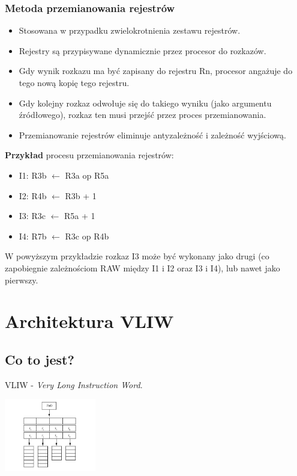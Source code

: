 		\subsubsection{Metoda przemianowania rejestrów}
			\begin{itemize}
				\item Stosowana w przypadku zwielokrotnienia zestawu rejestrów.
				\item Rejestry są przypisywane dynamicznie przez procesor do rozkazów.
				\item Gdy wynik rozkazu ma być zapisany do rejestru Rn, procesor angażuje do tego nową kopię tego rejestru.
				\item Gdy kolejny rozkaz odwołuje się do takiego wyniku (jako argumentu źródłowego), rozkaz ten musi przejść przez proces przemianowania.
				\item Przemianowanie rejestrów eliminuje antyzależność i zależność wyjściową.
			\end{itemize}
			\textbf{Przykład} procesu przemianowania rejestrów:
			\begin{itemize}
				\item I1: R3b $ \leftarrow $ R3a op R5a
				\item I2: R4b $ \leftarrow $ R3b + 1
				\item I3: R3c $ \leftarrow $ R5a + 1
				\item I4: R7b $ \leftarrow $ R3c op R4b
			\end{itemize}
			W powyższym przykładzie rozkaz I3 może być wykonany jako drugi (co zapobiegnie zależnościom RAW między I1 i I2 oraz I3 i I4), lub nawet jako pierwszy.
			
			
\section{Architektura VLIW}
	\subsection{Co to jest?}
		VLIW - \emph{Very Long Instruction Word}.
		\begin{center}
			\includegraphics[width=0.3\textwidth]{./images/VLIM01}
		\end{center}
